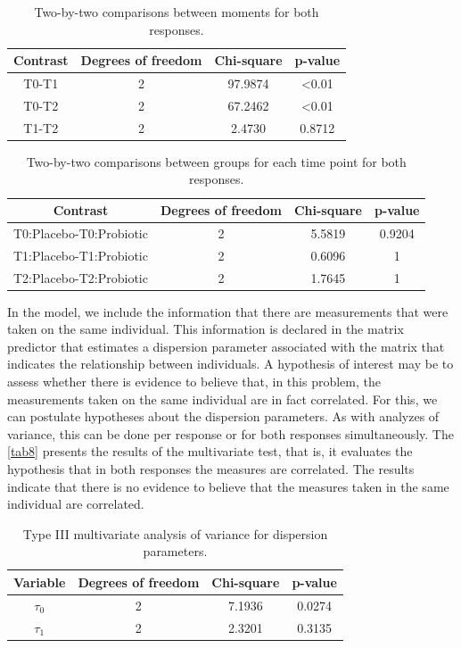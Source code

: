 \documentclass[USenglish]{article}
\theoremstyle{dgthm}
\theoremstyle{dgdef}
\begin{document}
\begin{table}[H]
\centering
\begin{tabular}{cccc}
\hline
Contrast  & Degrees of freedom & Chi-square   & p-value        \\ \hline
T0-T1     & 2                  & 97.9874      & \textless 0.01 \\
T0-T2     & 2                  & 67.2462      & \textless 0.01 \\
T1-T2     & 2                  & 2.4730       & 0.8712         \\ \hline
\end{tabular}
\caption{Two-by-two comparisons between moments for both responses.}
\label{tab6}
\end{table}

\begin{table}[H]
\centering
\begin{tabular}{cccc}
\hline
Contrast                 & Degrees of freedom & Chi-square   & p-value \\ \hline
T0:Placebo-T0:Probiotic  & 2                  & 5.5819       & 0.9204  \\
T1:Placebo-T1:Probiotic  & 2                  & 0.6096       & 1       \\
T2:Placebo-T2:Probiotic  & 2                  & 1.7645       & 1       \\ \hline
\end{tabular}
\caption{Two-by-two comparisons between groups for each time point for both responses.}
\label{tab7}
\end{table}

In the model, we include the information that there are measurements that were taken on the same individual. This information is declared in the matrix predictor that estimates a dispersion parameter associated with the matrix that indicates the relationship between individuals. A hypothesis of interest may be to assess whether there is evidence to believe that, in this problem, the measurements taken on the same individual are in fact correlated. For this, we can postulate hypotheses about the dispersion parameters. As with analyzes of variance, this can be done per response or for both responses simultaneously. The \autoref{tab8} presents the results of the multivariate test, that is, it evaluates the hypothesis that in both responses the measures are correlated. The results indicate that there is no evidence to believe that the measures taken in the same individual are correlated.

\begin{table}[H]
\centering
\begin{tabular}{cccc}
\hline
Variable               & Degrees of freedom & Chi-square & p-value        \\ \hline
$\tau_0$ & 2                  & 7.1936       & 0.0274  \\
$\tau_1$ & 2                  & 2.3201       & 0.3135         \\ \hline
\end{tabular}
\caption{Type III multivariate analysis of variance for dispersion parameters.}
\label{tab8}
\end{table}
\end{document}
